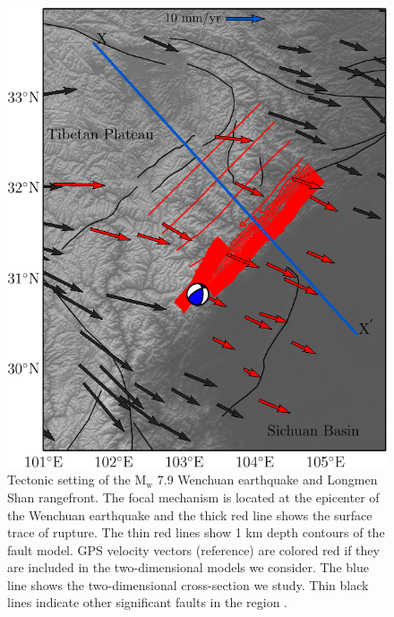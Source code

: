 \documentclass[12pt]{article}
\begin{document}
\begin{figure}[h!]
    \centering
    \includegraphics{figs/lms_map_all.pdf}
    \caption{Tectonic setting of the $\textrm{M}_{\textrm{w}}$ 7.9 Wenchuan earthquake and Longmen Shan rangefront. The focal mechanism is located at the epicenter of the Wenchuan earthquake and the thick red line shows the surface trace of rupture. The thin red lines show 1 km depth contours of the fault model. GPS velocity vectors (reference) are colored red if they are included in the two-dimensional models we consider. The blue line shows the two-dimensional cross-section we study. Thin black lines indicate other significant faults in the region \citep{Taylor09}.}
    \label{fig:regional_map}
\end{figure}
\end{document}
